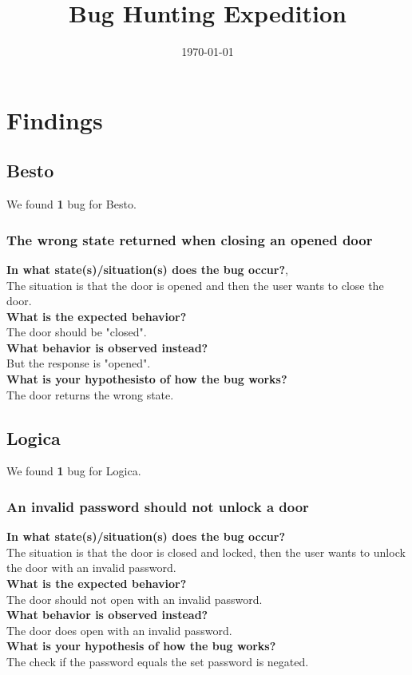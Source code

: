 \documentclass{uva-inf-article}
\title{Bug Hunting Expedition}
\date{\today}
\begin{document}
\maketitle


\section{Findings}
\subsection{Besto}
We found \textbf{1} bug for Besto.

\subsubsection{The wrong state returned when closing an opened door}
\textbf{In what state(s)/situation(s) does the bug occur?},\\
The situation is that the door is opened and then the user wants to close the door.\\
\textbf{What is the expected behavior?}\\
The door should be "closed".\\
\textbf{What behavior is observed instead?}\\
But the response is "opened".\\
\textbf{What is your hypothesisto  of how the bug works?}\\
The door returns the wrong state.

\subsection{Logica}
We found \textbf{1} bug for Logica.

\subsubsection{An invalid password should not unlock a door}
\textbf{In what state(s)/situation(s) does the bug occur?}\\
The situation is that the door is closed and locked, then the user wants to unlock the door with an invalid password.\\
\textbf{What is the expected behavior?}\\
The door should not open with an invalid password.\\
\textbf{What behavior is observed instead?}\\
The door does open with an invalid password.\\
\textbf{What is your hypothesis of how the bug works?}\\
The check if the password equals the set password is negated.
\end{document}
